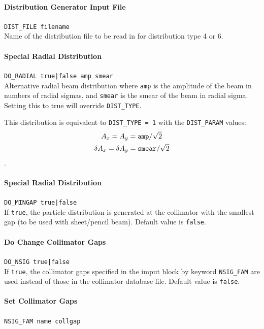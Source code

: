 \paragraph{Distribution Generator Input File} \texttt{DIST\_FILE filename}\\

Name of the distribution file to be read in for distribution type 4 or 6.

\paragraph{Special Radial Distribution} \texttt{DO\_RADIAL true|false amp smear}\\

Alternative radial beam distribution where \texttt{amp} is the amplitude of the beam in numbers of radial sigmas, and \texttt{smear} is the smear of the beam in radial sigma.
Setting this to true will override \texttt{DIST\_TYPE}.

This distribution is equivalent to \texttt{DIST\_TYPE = 1} with the \texttt{DIST\_PARAM} values:
\begin{align*}
   A_x = A_y &= \mbox{\texttt{amp}}/\sqrt{2}\\
   \delta A_x = \delta A_y &= \mbox{\texttt{smear}}/\sqrt{2}
\end{align*}.

\paragraph{Special Radial Distribution} \texttt{DO\_MINGAP true|false}\\

If \texttt{true}, the particle distribution is generated at the collimator with the smallest gap (to be used with sheet/pencil beam).
Default value is \texttt{false}.

\paragraph{Do Change Collimator Gaps} \texttt{DO\_NSIG true|false}\\

If \texttt{true}, the collimator gaps specified in the imput block by keyword \texttt{NSIG\_FAM} are used instead of those in the collimator database file.
Default value is \texttt{false}.

\paragraph{Set Collimator Gaps} \texttt{NSIG\_FAM name collgap}\\

